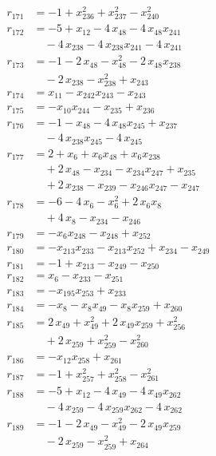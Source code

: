 \begin{align*}
r_{171} &= -1 + x_{236}^{2} + x_{237}^{2} - x_{240}^{2} \\
r_{172} &= -5 + x_{12} - 4\,x_{48} - 4\,x_{48} x_{241} \\
&\quad{}- 4\,x_{238} - 4\,x_{238} x_{241} - 4\,x_{241} \\
r_{173} &= -1 - 2\,x_{48} - x_{48}^{2} - 2\,x_{48} x_{238} \\
&\quad{}- 2\,x_{238} - x_{238}^{2} + x_{243} \\
r_{174} &= x_{11} - x_{242} x_{243} - x_{243} \\
r_{175} &= -x_{10} x_{244} - x_{235} + x_{236} \\
r_{176} &= -1 - x_{48} - 4\,x_{48} x_{245} + x_{237} \\
&\quad{}- 4\,x_{238} x_{245} - 4\,x_{245} \\
r_{177} &= 2 + x_{6} + x_{6} x_{48} + x_{6} x_{238} \\
&\quad{}+ 2\,x_{48} - x_{234} - x_{234} x_{247} + x_{235} \\
&\quad{}+ 2\,x_{238} - x_{239} - x_{246} x_{247} - x_{247} \\
r_{178} &= -6 - 4\,x_{6} - x_{6}^{2} + 2\,x_{6} x_{8} \\
&\quad{}+ 4\,x_{8} - x_{234} - x_{246} \\
r_{179} &= -x_{6} x_{248} - x_{248} + x_{252} \\
r_{180} &= -x_{213} x_{233} - x_{213} x_{252} + x_{234} - x_{249} \\
r_{181} &= -1 + x_{213} - x_{249} - x_{250} \\
r_{182} &= x_{6} - x_{233} - x_{251} \\
r_{183} &= -x_{195} x_{253} + x_{233} \\
r_{184} &= -x_{8} - x_{8} x_{49} - x_{8} x_{259} + x_{260} \\
r_{185} &= 2\,x_{49} + x_{49}^{2} + 2\,x_{49} x_{259} + x_{256}^{2} \\
&\quad{}+ 2\,x_{259} + x_{259}^{2} - x_{260}^{2} \\
r_{186} &= -x_{12} x_{258} + x_{261} \\
r_{187} &= -1 + x_{257}^{2} + x_{258}^{2} - x_{261}^{2} \\
r_{188} &= -5 + x_{12} - 4\,x_{49} - 4\,x_{49} x_{262} \\
&\quad{}- 4\,x_{259} - 4\,x_{259} x_{262} - 4\,x_{262} \\
r_{189} &= -1 - 2\,x_{49} - x_{49}^{2} - 2\,x_{49} x_{259} \\
&\quad{}- 2\,x_{259} - x_{259}^{2} + x_{264} \\

\end{align*}
